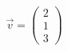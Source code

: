 \documentclass[preview]{standalone}
\begin{document}
\begin{align*}
\vec{v} = \begin{pmatrix}2\\1\\3\end{pmatrix}
\end{align*}
\end{document}
